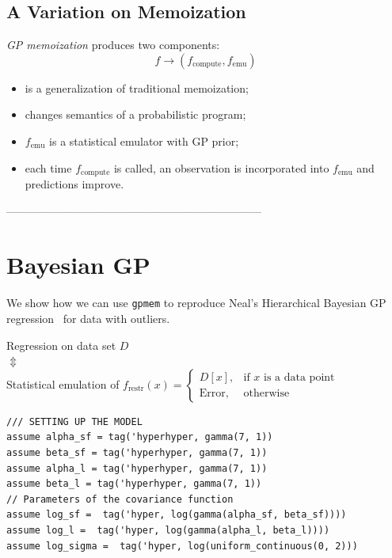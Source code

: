 \documentclass[a0,portrait]{a0poster}
\newcommand{\compute}{{\textrm{compute}}}
\newcommand{\emu}{{\textrm{emu}}}
\newcommand{\restr}{{\textrm{restr}}}
\begin{document}
\begin{multicols}{3}
\subsection*{A Variation on Memoization}
{\em GP memoization} produces two components:
\[ f \to (f_\compute, f_\emu) \]
\begin{itemize}
\setlength{\itemindent}{1cm}
 \item is a generalization of traditional memoization;
 \item changes semantics of a probabilistic program;
 \item $f_\emu$ is a statistical emulator with GP prior;
 \item each time $f_\compute$ is called, an observation is incorporated into $f_\emu$ and predictions improve.
\end{itemize}


---------------------------------------------------------------------


\section*{Bayesian GP}

We show how we can use  {\tt gpmem} to reproduce Neal's Hierarchical Bayesian GP regression~\cite{neal1997monte} for data with outliers.

\begin{center}
Regression on data set $D$ \\
$\Updownarrow$ \\
Statistical emulation of $f_\restr(x) = \begin{cases}
      D[x], & \text{if $x$ is a data point} \\
      \text{Error}, & \text{otherwise}
    \end{cases}$
\end{center}
\begin{minipage}{\linewidth}
\belowcaptionskip=-10pt
\begin{lstlisting}[frame=single,caption=Hierarchical  GP Smoothing,mathescape,label=alg:gphierarch]
/// SETTING UP THE MODEL
assume alpha_sf = tag('hyperhyper, gamma(7, 1))
assume beta_sf = tag('hyperhyper, gamma(7, 1))
assume alpha_l = tag('hyperhyper, gamma(7, 1))
assume beta_l = tag('hyperhyper, gamma(7, 1))
// Parameters of the covariance function
assume log_sf =  tag('hyper, log(gamma(alpha_sf, beta_sf))))
assume log_l =  tag('hyper, log(gamma(alpha_l, beta_l))))
assume log_sigma =  tag('hyper, log(uniform_continuous(0, 2)))


\end{lstlisting}
\end{minipage}
\end{multicols}
\end{document}
